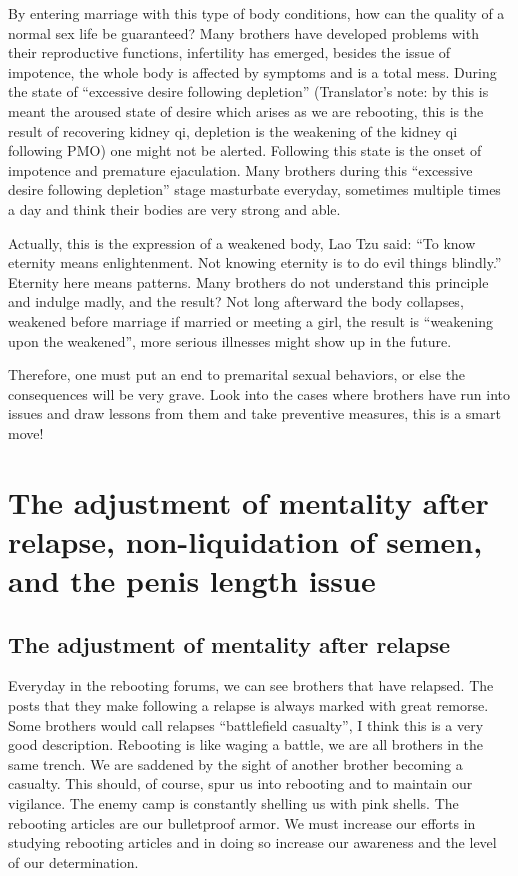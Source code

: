 \documentclass[
]{book}
\begin{document}
By entering marriage with this type of body conditions, how can the quality of a normal sex life be guaranteed? Many brothers have developed problems with their reproductive functions, infertility has emerged, besides the issue of impotence, the whole body is affected by symptoms and is a total mess. During the state of ``excessive desire following depletion'' (Translator's note: by this is meant the aroused state of desire which arises as we are rebooting, this is the result of recovering kidney qi, depletion is the weakening of the kidney qi following PMO) one might not be alerted. Following this state is the onset of impotence and premature ejaculation. Many brothers during this ``excessive desire following depletion'' stage masturbate everyday, sometimes multiple times a day and think their bodies are very strong and able.

Actually, this is the expression of a weakened body, Lao Tzu said: ``To know eternity means enlightenment. Not knowing eternity is to do evil things blindly.'' Eternity here means patterns. Many brothers do not understand this principle and indulge madly, and the result? Not long afterward the body collapses, weakened before marriage if married or meeting a girl, the result is ``weakening upon the weakened'', more serious illnesses might show up in the future.

Therefore, one must put an end to premarital sexual behaviors, or else the consequences will be very grave. Look into the cases where brothers have run into issues and draw lessons from them and take preventive measures, this is a smart move!

\hypertarget{the-adjustment-of-mentality-after-relapse-non-liquidation-of-semen-and-the-penis-length-issue}{%
\chapter{The adjustment of mentality after relapse, non-liquidation of semen, and the penis length issue}\label{the-adjustment-of-mentality-after-relapse-non-liquidation-of-semen-and-the-penis-length-issue}}

\hypertarget{the-adjustment-of-mentality-after-relapse}{%
\section{The adjustment of mentality after relapse}\label{the-adjustment-of-mentality-after-relapse}}

Everyday in the rebooting forums, we can see brothers that have relapsed. The posts that they make following a relapse is always marked with great remorse. Some brothers would call relapses ``battlefield casualty'', I think this is a very good description. Rebooting is like waging a battle, we are all brothers in the same trench. We are saddened by the sight of another brother becoming a casualty. This should, of course, spur us into rebooting and to maintain our vigilance. The enemy camp is constantly shelling us with pink shells. The rebooting articles are our bulletproof armor. We must increase our efforts in studying rebooting articles and in doing so increase our awareness and the level of our determination.
\end{document}
